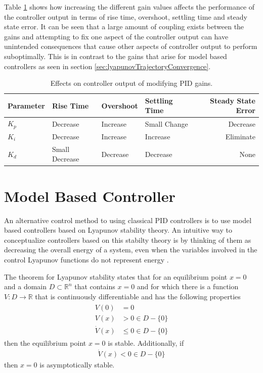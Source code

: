 Table \ref{tab:PIDGainEffects} shows how increasing the different gain values affects the performance of the controller output in terms of rise time, overshoot, settling time and steady state error. It can be seen that a large amount of coupling exists between the gains and attempting to fix one aspect of the controller output can have unintended consequences that cause other aspects of controller output to perform suboptimally. This is in contrast to the gains that arise for model based controllers as seen in section \ref{sec:lyapunovTrajectoryConvergence}.

\begin{table}[ht!]
\caption{Effects on controller output of modifying PID gains.}
\small
\centering
\begin{tabular}{@{}llllr@{}} \toprule
Parameter    & Rise Time      & Overshoot & Settling Time & Steady State Error \\ \midrule
$K_p$        & Decrease       & Increase  & Small Change  & Decrease \\
$K_i$        & Decrease       & Increase  & Increase      & Eliminate \\
$K_d$        & Small Decrease & Decrease  & Decrease      & None \\ \bottomrule
\end{tabular}
\label{tab:PIDGainEffects}
\end{table}

\section{Model Based Controller}
\label{sec:lyapunov}
An alternative control method to using classical PID controllers is to use model based controllers based on Lyapunov stability theory. An intuitive way to conceptualize controllers based on this stabilty theory is by thinking of them as decreasing the overall energy of a system, even when the variables involved in the control Lyapunov functions do not represent energy \cite{Khalil02}.

The theorem for Lyapunov stability states that for an equilibrium point $x=0$ and a domain $D\subset\mathbb{R}^n$ that contains $x=0$ and for which there is a function $V:D\to\mathbb{R}$ that is continuously differentiable and has the following properties 
\begin{align*}
\begin{split}
V(0) &= 0 \\
V(x) &> 0 \in D-\{0\} \\
\dot{V}(x) &\leq 0 \in D-\{0\}
\end{split}
\end{align*}
then the equilibrium point $x=0$ is stable. Additionally, if
\begin{align*}
\dot{V}(x) < 0 \in D - \{0\}
\end{align*}
then $x=0$ is asymptotically stable.

